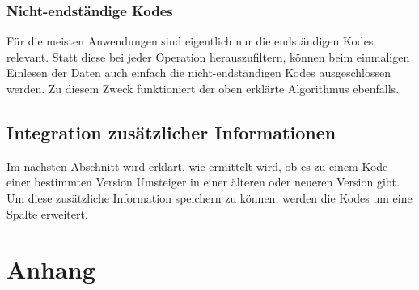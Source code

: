 \subsubsection{Nicht-endständige Kodes}

Für die meisten Anwendungen sind eigentlich nur die endständigen Kodes relevant. Statt diese bei jeder Operation herauszufiltern, können beim einmaligen Einlesen der Daten auch einfach die nicht-endständigen Kodes ausgeschlossen werden. Zu diesem Zweck funktioniert der oben erklärte Algorithmus ebenfalls. 

\subsection{Integration zusätzlicher Informationen}

Im nächsten Abschnitt wird erklärt, wie ermittelt wird, ob es zu einem Kode einer bestimmten Version Umsteiger in einer älteren oder neueren Version gibt. Um diese zusätzliche Information speichern zu können, werden die Kodes um eine Spalte erweitert. 




\appendix
\section*{Anhang}




